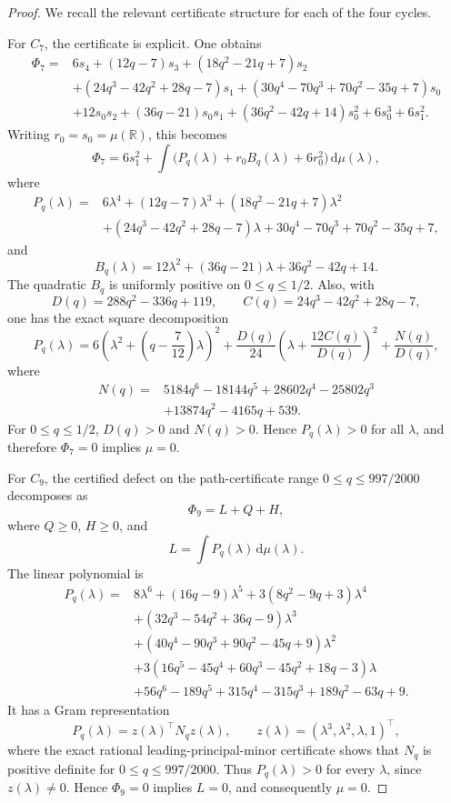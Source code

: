 \documentclass[11pt]{article}
\newcommand{\dd}{\,\mathrm d}
\begin{document}
\begin{proof}
We recall the relevant certificate structure for each of the four cycles.

For \(C_7\), the certificate is explicit.  One obtains
\[
\begin{aligned}
\Phi_7={}&6s_4+(12q-7)s_3+(18q^2-21q+7)s_2  \\
&+(24q^3-42q^2+28q-7)s_1
 +(30q^4-70q^3+70q^2-35q+7)s_0 \\
&+12s_0s_2+(36q-21)s_0s_1
 +(36q^2-42q+14)s_0^2+6s_0^3+6s_1^2 .
\end{aligned}
\]
Writing \(r_0=s_0=\mu(\mathbb R)\), this becomes
\[
        \Phi_7=6s_1^2+
        \int \bigl(P_q(\lambda)+r_0B_q(\lambda)+6r_0^2\bigr)\dd\mu(\lambda),
\]
where
\[
\begin{aligned}
P_q(\lambda)={}&6\lambda^4+(12q-7)\lambda^3+(18q^2-21q+7)\lambda^2\\
&+(24q^3-42q^2+28q-7)\lambda
 +30q^4-70q^3+70q^2-35q+7,
\end{aligned}
\]
and
\[
        B_q(\lambda)=12\lambda^2+(36q-21)\lambda+36q^2-42q+14.
\]
The quadratic \(B_q\) is uniformly positive on \(0\le q\le1/2\).  Also,
with
\[
        D(q)=288q^2-336q+119,
        \qquad C(q)=24q^3-42q^2+28q-7,
\]
one has the exact square decomposition
\[
        P_q(\lambda)
        =6\left(\lambda^2+\left(q-\frac7{12}\right)\lambda\right)^2
        +\frac{D(q)}{24}\left(\lambda+\frac{12C(q)}{D(q)}\right)^2
        +\frac{N(q)}{D(q)},
\]
where
\[
\begin{aligned}
N(q)={}&5184q^6-18144q^5+28602q^4-25802q^3\\
&+13874q^2-4165q+539.
\end{aligned}
\]
For \(0\le q\le1/2\), \(D(q)>0\) and \(N(q)>0\).  Hence
\(P_q(\lambda)>0\) for all \(\lambda\), and therefore \(\Phi_7=0\) implies
\(\mu=0\).

For \(C_9\), the certified defect on the path-certificate range
\(0\le q\le 997/2000\) decomposes as
\[
        \Phi_9=L+Q+H,
\]
where \(Q\ge0\), \(H\ge0\), and
\[
        L=\int P_q(\lambda)\dd\mu(\lambda).
\]
The linear polynomial is
\[
\begin{aligned}
P_q(\lambda)={}&8\lambda^6+(16q-9)\lambda^5
+3(8q^2-9q+3)\lambda^4\\
&+(32q^3-54q^2+36q-9)\lambda^3\\
&+(40q^4-90q^3+90q^2-45q+9)\lambda^2\\
&+3(16q^5-45q^4+60q^3-45q^2+18q-3)\lambda\\
&+56q^6-189q^5+315q^4-315q^3+189q^2-63q+9.
\end{aligned}
\]
It has a Gram representation
\[
        P_q(\lambda)=z(\lambda)^\top N_q z(\lambda),
        \qquad z(\lambda)=(\lambda^3,\lambda^2,\lambda,1)^\top,
\]
where the exact rational leading-principal-minor certificate shows that
\(N_q\) is positive definite for \(0\le q\le997/2000\).  Thus
\(P_q(\lambda)>0\) for every \(\lambda\), since \(z(\lambda)\ne0\).  Hence
\(\Phi_9=0\) implies \(L=0\), and consequently \(
\mu=0\).


\end{proof}
\end{document}
